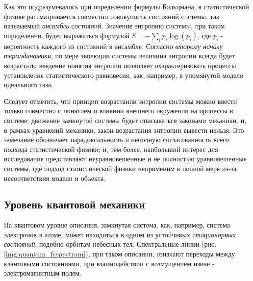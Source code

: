 
Как это подразумевалось при определении формулы Больцмана, в статистической физике рассматривается совместно совокупость состояний системы, так называемый \textit{ансамбль} состояний. Значение энтропию системы, при таком определении, будет выражаться формулой $S = - \sum_i p_i \log( p_i)$, где $p_i$ - вероятность каждого из состояний в ансамбле. Согласно \textit{второму началу термодинамики}, по мере эволюции системы величина энтропии всегда будет возрастать; введение понятия энтропии позволяет охарактеризовать процессы установления статистического равновесия, как, например, в упомянутой модели идеального газа. 

Следует отметить, что принцип возрастании энтропии системы можно ввести только совместно с понятием о влиянии внешнего окружения на процессы в системе; движение замкнутой системы будет описываться законами механики, и, в рамках уравнений механики, закон возрастания энтропии вывести нельзя. Это замечание обозначает парадоксальность и неполную согласованность всего подхода статистической физики; и, тем более, наибольший интерес для исследования представляют неуравновешенные и не полностью уравновешенные системы, где подход статистической физики неприменим в полной мере из-за несоответствия модели и объекта.

\subsection{Уровень квантовой механики}




На квантовом уровне описания, замкнутая система, как, например, система электронов в атоме, может находиться в одном из устойчивых \textit{стационарных состояний}, подобно орбитам небесных тел. Спектральные линии (рис. \ref{img:quantum_fespectrum}), при таком описании, означают переходы между квантовыми состояниями, при взаимодействии с возмущением извне - электромагнитным полем.

